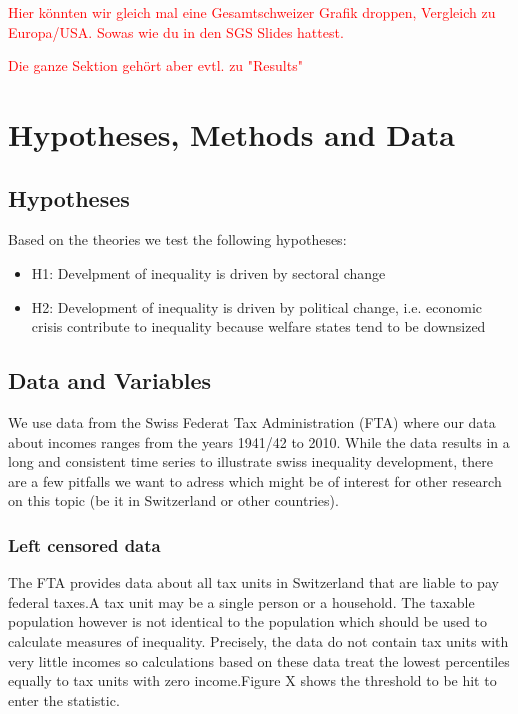 \documentclass[twoside]{article}\usepackage[]{graphicx}\usepackage[]{color}
\begin{document}
\begin{multicols}{2}
\textcolor{red}{Hier könnten wir gleich mal eine Gesamtschweizer  Grafik droppen, Vergleich zu Europa/USA. Sowas wie du in den SGS Slides hattest.}

\textcolor{red}{Die ganze Sektion gehört aber evtl. zu "Results"}






\section{Hypotheses, Methods and Data}

\subsection{Hypotheses}
Based on the theories we test the following hypotheses:

\begin{itemize}
\item H1: Develpment of inequality is driven by sectoral change
\item H2: Development of inequality is driven by political change, i.e. economic crisis contribute to inequality because welfare states tend to be downsized
\end{itemize}

\subsection{Data and Variables}

We use data from the Swiss Federat Tax Administration (FTA) where our data about incomes ranges from the years 1941/42 to 2010. While the data results in a long and consistent time series to illustrate swiss inequality development, there are a few pitfalls we want to adress which might be of interest for other research on this topic (be it in Switzerland or other countries).

\subsubsection{Left censored data}

The FTA provides data about all tax units in Switzerland that are liable to pay federal taxes.A tax unit may be a single person or a household. The taxable population however is not identical to the population which should be used to calculate measures of inequality. Precisely, the data do not contain tax units with very little incomes so calculations based on these data treat the lowest percentiles equally to tax units with zero income.Figure X shows the threshold to be hit to enter the statistic.


\end{multicols}
\end{document}
